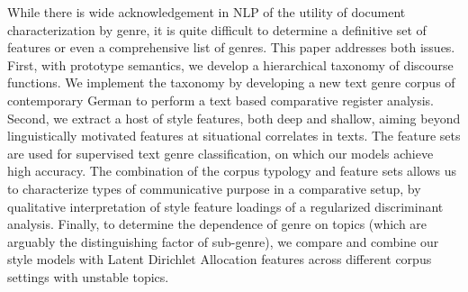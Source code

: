 While there is wide acknowledgement in NLP of the utility of document characterization by genre, it is quite difficult to determine a definitive set of features or even a comprehensive list of genres. This paper addresses both issues. First, with prototype semantics, we develop a hierarchical taxonomy of discourse functions. We implement the taxonomy by developing a new text genre corpus of contemporary German to perform a text based comparative register analysis. Second, we extract a host of style features, both deep and shallow, aiming beyond linguistically motivated features at situational correlates in texts. The feature sets are used for supervised text genre classification, on which our models achieve high accuracy. The combination of the corpus typology and feature sets allows us to characterize types of communicative purpose in a comparative setup, by qualitative interpretation of style feature loadings of a regularized discriminant analysis. Finally, to determine the dependence of genre on topics (which are arguably the distinguishing factor of sub-genre), we compare and combine our style models with Latent Dirichlet Allocation features across different corpus settings with unstable topics.
